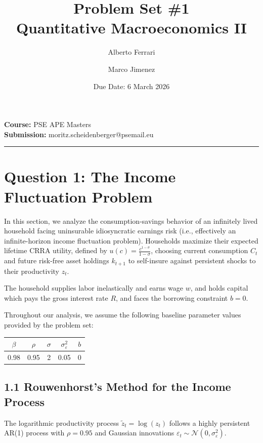 \documentclass[11pt, a4paper]{article}
\title{\textbf{Problem Set \#1} \\ \large Quantitative Macroeconomics II}
\author{Alberto Ferrari \and Marco Jimenez}
\date{Due Date: 6 March 2026}
\begin{document}
\maketitle

\noindent \textbf{Course:} PSE APE Masters\\
\textbf{Submission:} moritz.scheidenberger@psemail.eu

\vspace{1em}
\hrule
\vspace{1em}

\section*{Question 1: The Income Fluctuation Problem}
In this section, we analyze the consumption-savings behavior of an infinitely lived household facing uninsurable idiosyncratic earnings risk (i.e., effectively an infinite-horizon income fluctuation problem). Households maximize their expected lifetime CRRA utility, defined by $u(c) = \frac{c^{1-\sigma}}{1-\sigma}$, choosing current consumption $C_t$ and future risk-free asset holdings $k_{t+1}$ to self-insure against persistent shocks to their productivity $z_t$.

The household supplies labor inelastically and earns wage $w$, and holds capital which pays the gross interest rate $R$, and faces the borrowing constraint $b=0$.

Throughout our analysis, we assume the following baseline parameter values provided by the problem set:
\begin{table}[H]
    \centering
    \begin{tabular}{ccccc}
    \toprule
    $\beta$ & $\rho$ & $\sigma$ & $\sigma_\varepsilon^2$ & $b$ \\
    \midrule
    0.98 & 0.95 & 2 & 0.05 & 0 \\
    \bottomrule
    \end{tabular}
\end{table}

\subsection*{1.1 Rouwenhorst's Method for the Income Process}
The logarithmic productivity process $\tilde{z}_t = \log(z_t)$ follows a highly persistent AR(1) process with $\rho = 0.95$ and Gaussian innovations $\varepsilon_t \sim \mathcal{N}(0, \sigma_\varepsilon^2)$.
\end{document}
